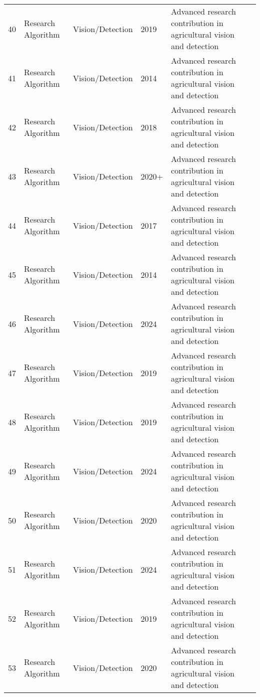 \begin{table*}[htbp]
\begin{tabular}{p{}p{}p{}p{}p{}p{}}
 40 & Research Algorithm & Vision/Detection & 2019 & Advanced research contribution in agricultural vision and detection & \cite{gene2019fruit} \\
 41 & Research Algorithm & Vision/Detection & 2014 & Advanced research contribution in agricultural vision and detection & \cite{girshick2014rcnn} \\
 42 & Research Algorithm & Vision/Detection & 2018 & Advanced research contribution in agricultural vision and detection & \cite{gongal2018apple} \\
 43 & Research Algorithm & Vision/Detection & 2020+ & Advanced research contribution in agricultural vision and detection & \cite{hart1968formal} \\
 44 & Research Algorithm & Vision/Detection & 2017 & Advanced research contribution in agricultural vision and detection & \cite{he2017mask} \\
 45 & Research Algorithm & Vision/Detection & 2014 & Advanced research contribution in agricultural vision and detection & \cite{hemming2014fruit} \\
 46 & Research Algorithm & Vision/Detection & 2024 & Advanced research contribution in agricultural vision and detection & \cite{heschl2024synthset} \\
 47 & Research Algorithm & Vision/Detection & 2019 & Advanced research contribution in agricultural vision and detection & \cite{hohimer2019design} \\
 48 & Research Algorithm & Vision/Detection & 2019 & Advanced research contribution in agricultural vision and detection & \cite{horng2019smart} \\
 49 & Research Algorithm & Vision/Detection & 2024 & Advanced research contribution in agricultural vision and detection & \cite{ieee2024grape} \\
 50 & Research Algorithm & Vision/Detection & 2020 & Advanced research contribution in agricultural vision and detection & \cite{jia2020detection} \\
 51 & Research Algorithm & Vision/Detection & 2024 & Advanced research contribution in agricultural vision and detection & \cite{jiang2024tomato} \\
 52 & Research Algorithm & Vision/Detection & 2019 & Advanced research contribution in agricultural vision and detection & \cite{kang2019fruit} \\
 53 & Research Algorithm & Vision/Detection & 2020 & Advanced research contribution in agricultural vision and detection & \cite{kang2020fruit} \\

\end{tabular}
\end{table*}
